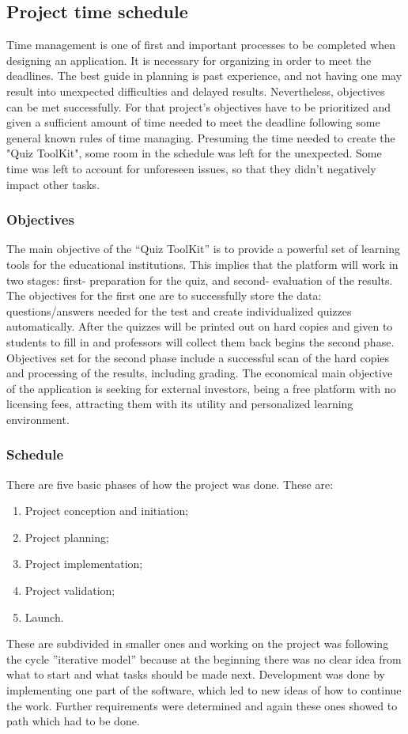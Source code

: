 \subsection{Project time schedule}
Time management is one of first and important processes to be completed when designing an application. It is necessary for organizing in order to meet the deadlines. The best guide in planning is past experience, and not having one may result into unexpected difficulties and delayed results. Nevertheless, objectives can be met successfully. For that project’s objectives have to be prioritized and given a sufficient amount of time needed to meet the deadline following some general known rules of time managing. Presuming the time needed to create the "Quiz ToolKit", some room in the schedule was left for the unexpected. Some time was left to account for unforeseen issues, so that they didn't negatively impact other tasks.
\subsubsection{Objectives}
The main objective of the “Quiz ToolKit” is to provide a powerful set of learning tools for the educational institutions. This implies that the platform will work in two stages: first- preparation for the quiz, and second- evaluation of the results. The objectives for the first one are to successfully store the data: questions/answers needed for the test and create individualized quizzes automatically. After the quizzes will be printed out on hard copies and given to students to fill in and professors will collect them back begins the second phase. Objectives set for the second phase include a successful scan of the hard copies and processing of the results, including grading. 
The economical main objective of the application is seeking for external investors, being a free platform with no licensing fees, attracting them with its utility and personalized learning environment. 

\subsubsection{Schedule}
There are five basic phases of how the project was done. These are:
\begin{enumerate}
  \item Project conception and initiation;
  \item Project planning;
  \item Project implementation;
  \item Project validation; 
  \item Launch. 
\end{enumerate}
These are subdivided in smaller ones and working on the project was following the cycle ”iterative model” because at the beginning there was no clear idea from what to start and what tasks should be made next. Development was done by implementing one part of the software, which led to new ideas of how to continue the work. Further requirements were determined and again these ones showed to path which had to be done. 

